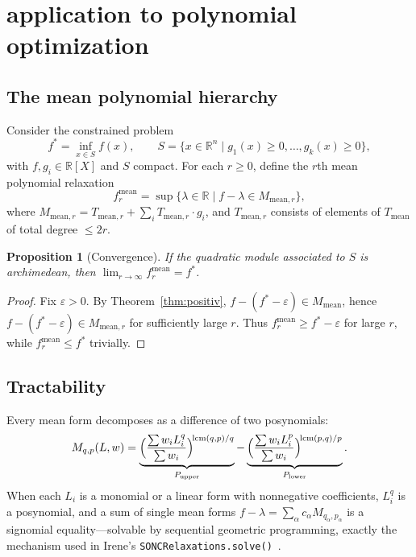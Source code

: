 \documentclass{amsart}
\newtheorem{prop}[thm]{Proposition}
\theoremstyle{definition}
\numberwithin{equation}{section}
\newcommand{\reals}{\mathbb{R}}
\begin{document}
\section{application to polynomial optimization}\label{sec:optim}

\subsection{The mean polynomial hierarchy}

Consider the constrained problem
\begin{equation}\label{eq:pop}
f^*=\inf_{x\in S}f(x),\qquad
S=\{x\in\reals^n\mid g_1(x)\ge0,\dots,g_k(x)\ge0\},
\end{equation}
with $f,g_i\in\reals[X]$ and $S$ compact.  For each $r\ge0$, define the
$r$th mean polynomial relaxation
\[
f^{\mathrm{mean}}_r=\sup\{\lambda\in\reals\mid f-\lambda\in M_{\mathrm{mean},r}\},
\]
where $M_{\mathrm{mean},r}=T_{\mathrm{mean},r}+\sum_i T_{\mathrm{mean},r}\cdot g_i$,
and $T_{\mathrm{mean},r}$ consists of elements of $T_{\mathrm{mean}}$ of
total degree $\le2r$.

\begin{prop}[Convergence]\label{prop:convergence}
If the quadratic module associated to $S$ is archimedean, then
$\lim_{r\to\infty}f^{\mathrm{mean}}_r=f^*$.
\end{prop}

\begin{proof}
Fix $\varepsilon>0$.  By Theorem~\ref{thm:positiv},
$f-(f^*-\varepsilon)\in M_{\mathrm{mean}}$, hence
$f-(f^*-\varepsilon)\in M_{\mathrm{mean},r}$ for sufficiently large $r$.
Thus $f^{\mathrm{mean}}_r\ge f^*-\varepsilon$ for large $r$, while
$f^{\mathrm{mean}}_r\le f^*$ trivially.
\end{proof}

\subsection{Tractability}

Every mean form decomposes as a difference of two posynomials:
\begin{equation}\label{eq:mean-posynomial}
M_{q,p}(L,w)=
\underbrace{\Bigl(\frac{\sum w_iL_i^{q}}{\sum w_i}\Bigr)^{\!\operatorname{lcm}(q,p)/q}}_{P_{\mathrm{upper}}}
-\underbrace{\Bigl(\frac{\sum w_iL_i^{p}}{\sum w_i}\Bigr)^{\!\operatorname{lcm}(p,q)/p}}_{P_{\mathrm{lower}}}.
\end{equation}
When each $L_i$ is a monomial or a linear form with nonnegative
coefficients, $L_i^{q}$ is a posynomial, and a sum of single mean forms
$f-\lambda=\sum_\alpha c_\alpha M_{q_\alpha,p_\alpha}$ is a signomial
equality---solvable by sequential geometric programming, exactly the
mechanism used in Irene's \texttt{SONCRelaxations.solve()}~\cite{GMIr}.
\end{document}
